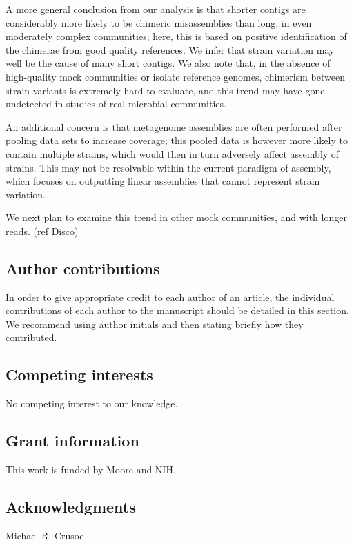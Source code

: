 \documentclass[10pt,a4paper,twocolumn]{article}
\begin{document}
A more general conclusion from our analysis is that shorter contigs
are considerably more likely to be chimeric misassemblies than long,
in even moderately complex communities; here, this is based on positive
identification of the chimerae from good quality references.  We infer
that strain variation may well be the cause of many short contigs. We
also note that, in the absence of high-quality mock communities or
isolate reference genomes, chimerism between strain variants is
extremely hard to evaluate, and this trend may have gone undetected in
studies of real microbial communities.

An additional concern is that metagenome assemblies are often
performed after pooling data sets to increase coverage; this pooled
data is however more likely to contain multiple strains, which would
then in turn adversely affect assembly of strains.  This may not be
resolvable within the current paradigm of assembly, which focuses on
outputting linear assemblies that cannot represent strain variation.

We next plan to examine this trend in other mock communities, and with
longer reads. (ref Disco)

%

\subsection*{Author contributions}
In order to give appropriate credit to each author of an article, the
individual contributions of each author to the manuscript should be
detailed in this section. We recommend using author initials and then
stating briefly how they contributed.

\subsection*{Competing interests}
No competing interest to our knowledge.

\subsection*{Grant information}
This work is funded by Moore and NIH.

\subsection*{Acknowledgments}
Michael R. Crusoe
\end{document}
